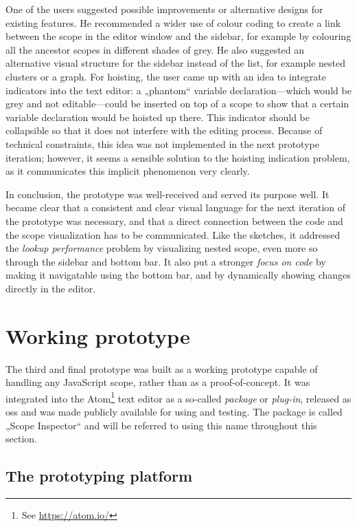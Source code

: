 One of the users suggested possible improvements or alternative designs
for existing features. He recommended a wider use of colour coding to
create a link between the scope in the editor window and the sidebar,
for example by colouring all the ancestor scopes in different shades of
grey. He also suggested an alternative visual structure for the sidebar
instead of the list, for example nested clusters or a graph. For
hoisting, the user came up with an idea to integrate indicators into the
text editor: a „phantom“ variable declaration—which would be grey and
not editable—could be inserted on top of a scope to show that a certain
variable declaration would be hoisted up there. This indicator should be
collapsible so that it does not interfere with the editing process.
Because of technical constraints, this idea was not implemented in the
next prototype iteration; however, it seems a sensible solution to the
hoisting indication problem, as it communicates this implicit phenomenon
very clearly.

In conclusion, the prototype was well-received and served its purpose
well. It became clear that a consistent and clear visual language for
the next iteration of the prototype was necessary, and that a direct
connection between the code and the scope visualization has to be
communicated. Like the sketches, it addressed the \emph{lookup
performance} problem by visualizing nested scope, even more so through
the sidebar and bottom bar. It also put a stronger \emph{focus on code}
by making it navigatable using the bottom bar, and by dynamically
showing changes directly in the editor.

\section{Working prototype}\label{working-prototype}

The third and final prototype was built as a working prototype capable
of handling any JavaScript scope, rather than as a proof-of-concept. It
was integrated into the Atom\footnote{See \url{https://atom.io/}} text
editor as a so-called \emph{package} or \emph{plug-in}, released as
\gls{oss} and was made publicly available for using and testing. The
package is called „Scope Inspector“ and will be referred to using this
name throughout this section.

\subsection{The prototyping platform}\label{the-prototyping-platform}

